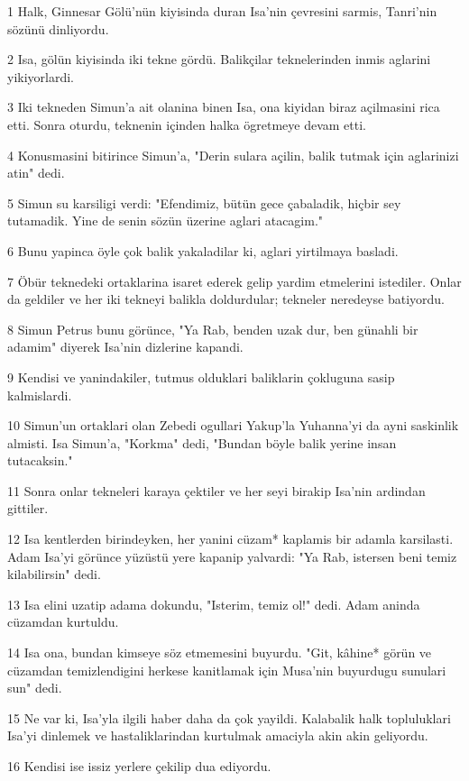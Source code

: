 \par 1 Halk, Ginnesar Gölü'nün kiyisinda duran Isa'nin çevresini sarmis, Tanri'nin sözünü dinliyordu.
\par 2 Isa, gölün kiyisinda iki tekne gördü. Balikçilar teknelerinden inmis aglarini yikiyorlardi.
\par 3 Iki tekneden Simun'a ait olanina binen Isa, ona kiyidan biraz açilmasini rica etti. Sonra oturdu, teknenin içinden halka ögretmeye devam etti.
\par 4 Konusmasini bitirince Simun'a, "Derin sulara açilin, balik tutmak için aglarinizi atin" dedi.
\par 5 Simun su karsiligi verdi: "Efendimiz, bütün gece çabaladik, hiçbir sey tutamadik. Yine de senin sözün üzerine aglari atacagim."
\par 6 Bunu yapinca öyle çok balik yakaladilar ki, aglari yirtilmaya basladi.
\par 7 Öbür teknedeki ortaklarina isaret ederek gelip yardim etmelerini istediler. Onlar da geldiler ve her iki tekneyi balikla doldurdular; tekneler neredeyse batiyordu.
\par 8 Simun Petrus bunu görünce, "Ya Rab, benden uzak dur, ben günahli bir adamim" diyerek Isa'nin dizlerine kapandi.
\par 9 Kendisi ve yanindakiler, tutmus olduklari baliklarin çokluguna sasip kalmislardi.
\par 10 Simun'un ortaklari olan Zebedi ogullari Yakup'la Yuhanna'yi da ayni saskinlik almisti. Isa Simun'a, "Korkma" dedi, "Bundan böyle balik yerine insan tutacaksin."
\par 11 Sonra onlar tekneleri karaya çektiler ve her seyi birakip Isa'nin ardindan gittiler.
\par 12 Isa kentlerden birindeyken, her yanini cüzam* kaplamis bir adamla karsilasti. Adam Isa'yi görünce yüzüstü yere kapanip yalvardi: "Ya Rab, istersen beni temiz kilabilirsin" dedi.
\par 13 Isa elini uzatip adama dokundu, "Isterim, temiz ol!" dedi. Adam aninda cüzamdan kurtuldu.
\par 14 Isa ona, bundan kimseye söz etmemesini buyurdu. "Git, kâhine* görün ve cüzamdan temizlendigini herkese kanitlamak için Musa'nin buyurdugu sunulari sun" dedi.
\par 15 Ne var ki, Isa'yla ilgili haber daha da çok yayildi. Kalabalik halk topluluklari Isa'yi dinlemek ve hastaliklarindan kurtulmak amaciyla akin akin geliyordu.
\par 16 Kendisi ise issiz yerlere çekilip dua ediyordu.

